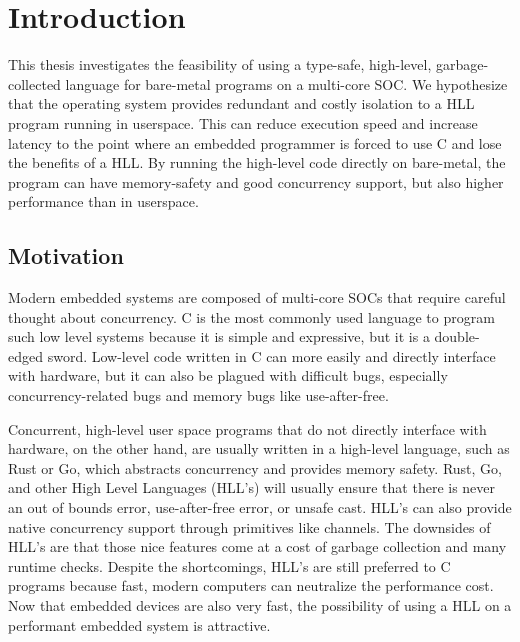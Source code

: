 
\chapter{Introduction}

This thesis investigates the feasibility of using a type-safe,
high-level, garbage-collected language for bare-metal programs
on a multi-core SOC. We hypothesize that the operating system
provides redundant and costly isolation to a HLL program running in userspace.
This can reduce execution speed and increase latency to the point where
an embedded programmer is forced to use C and lose the benefits of a HLL.
By running the high-level code directly on bare-metal, the program
can have memory-safety and good concurrency support, but also higher
performance than in userspace.

\section{Motivation}

Modern embedded systems are composed of multi-core SOCs that require
careful thought about concurrency. C is the
most commonly used language to program such low level systems because
it is simple and expressive, but it is
a double-edged sword. Low-level code written in C can more easily and
directly interface with hardware, but it can also be plagued with
difficult bugs, especially concurrency-related bugs and memory bugs like
use-after-free.

Concurrent, high-level user space programs that do not directly interface with
hardware, on the other hand, are usually written in a
high-level language, such as Rust or Go, which abstracts concurrency
and provides memory safety. Rust, Go, and other High Level Languages (HLL's)
will usually ensure that there is never an out of bounds error,
use-after-free error, or unsafe cast. HLL's can also provide native concurrency
support through primitives like channels. The downsides of HLL's are that those
nice features come at a cost of garbage collection and many runtime checks.
Despite the shortcomings, HLL's are still preferred to C programs because fast,
modern computers can neutralize the performance cost. Now that embedded devices are also very fast,
the possibility of using a HLL on a performant embedded system is attractive.

